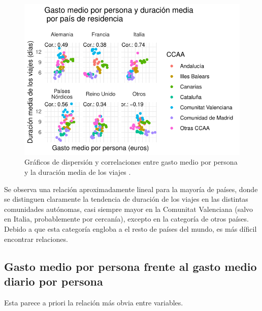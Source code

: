 \documentclass[data,article,submit,moreauthors,pdftex]{Definitions/mdpi}
\begin{document}
\begin{figure}[H]
\includegraphics{ProyectoAED2024_Rmd_files/figure-latex/unnamed-chunk-40-1} \caption{Gráficos de dispersión y correlaciones entre gasto medio por persona y la duración media de los viajes .\label{fig:gastomediovsduracionmedia}}\label{fig:unnamed-chunk-40}
\end{figure}

Se observa una relación aproximadamente lineal para la mayoría de
países, donde se distinguen claramente la tendencia de duración de los
viajes en las distintas comunidades autónomas, casi siempre mayor en la
Comunitat Valenciana (salvo en Italia, probablemente por cercanía),
excepto en la categoría de otros países. Debido a que esta categoría
engloba a el resto de países del mundo, es más díficil encontrar
relaciones.

\subsection{Gasto medio por persona frente al gasto medio diario por
persona}\label{gasto-medio-por-persona-frente-al-gasto-medio-diario-por-persona}

Esta parece a priori la relación más obvia entre variables.
\end{document}
